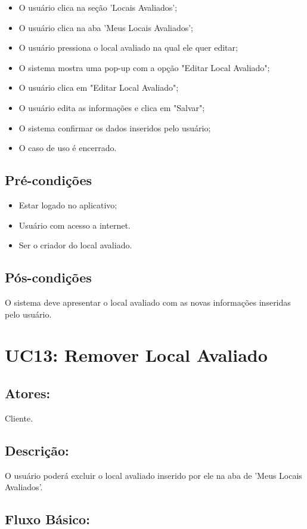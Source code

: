 \begin{itemize}
    \item O usuário clica na seção 'Locais Avaliados';
    \item O usuário clica na aba 'Meus Locais Avaliados';
    \item O usuário pressiona o local avaliado na qual ele quer editar;
    \item O sistema mostra uma pop-up com a opção "Editar Local Avaliado";
    \item O usuário clica em "Editar Local Avaliado";
    \item O usuário edita as informações e clica em "Salvar";
    \item O sistema confirmar os dados inseridos pelo usuário;
    \item O caso de uso é encerrado. 
\end{itemize}

\subsection{Pré-condições}
\begin{itemize}
    \item Estar logado no aplicativo;
    \item Usuário com acesso a internet. 
    \item Ser o criador do local avaliado. 
\end{itemize}

\subsection{Pós-condições}
O sistema deve apresentar o local avaliado com as novas informações inseridas pelo usuário.

\section{UC13: Remover Local Avaliado}

\subsection{Atores:}
Cliente.
\subsection{Descrição:}
O usuário poderá excluir o local avaliado inserido por ele na aba de 'Meus Locais Avaliados'.
\subsection{Fluxo Básico:}

